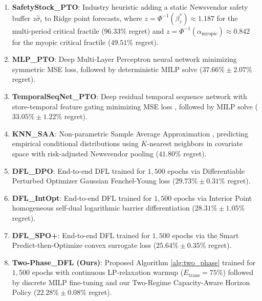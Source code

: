 \documentclass[11pt,a4paper]{article}
\theoremstyle{definition}
\theoremstyle{remark}
\begin{document}
\begin{enumerate}[label=\arabic*.]
    \item \textbf{SafetyStock\_PTO}: Industry heuristic adding a static Newsvendor safety buffer $z \hat{\sigma}_i$ to Ridge point forecasts, where $z = \Phi^{-1}(\beta_\tau^*) \approx 1.187$ for the multi-period critical fractile ($96.33\%$ regret) and $z = \Phi^{-1}(\alpha_{\text{myopic}}) \approx 0.842$ for the myopic critical fractile ($49.51\%$ regret).
    \item \textbf{MLP\_PTO}: Deep Multi-Layer Perceptron neural network minimizing symmetric MSE loss, followed by deterministic MILP solve ($37.66\% \pm 2.07\%$ regret).
    \item \textbf{TemporalSeqNet\_PTO}: Deep residual temporal sequence network with store-temporal feature gating minimizing MSE loss \citep{lim2021temporal}, followed by MILP solve ($33.05\% \pm 1.22\%$ regret).
    \item \textbf{KNN\_SAA}: Non-parametric Sample Average Approximation \citep{bertsimas2020predictive}, predicting empirical conditional distributions using $K$-nearest neighbors in covariate space with risk-adjusted Newsvendor pooling ($41.80\%$ regret).
    \item \textbf{DFL\_DPO}: End-to-end DFL trained for $1,500$ epochs via Differentiable Perturbed Optimizer Gaussian Fenchel-Young loss \citep{berthet2020learning} ($29.73\% \pm 0.31\%$ regret).
    \item \textbf{DFL\_IntOpt}: End-to-end DFL trained for $1,500$ epochs via Interior Point homogeneous self-dual logarithmic barrier differentiation \citep{mandi2020interior} ($28.31\% \pm 1.05\%$ regret).
    \item \textbf{DFL\_SPO+}: End-to-end DFL trained for $1,500$ epochs via the Smart Predict-then-Optimize convex surrogate loss \citep{elmachtoub2022smart} ($25.64\% \pm 0.35\%$ regret).
    \item \textbf{Two-Phase\_DFL (Ours)}: Proposed Algorithm \ref{alg:two_phase} trained for $1,500$ epochs with continuous LP-relaxation warmup ($E_{\text{trans}} = 75\%$) followed by discrete MILP fine-tuning and our Two-Regime Capacity-Aware Horizon Policy ($22.28\% \pm 0.08\%$ regret).
\end{enumerate}
\end{document}
